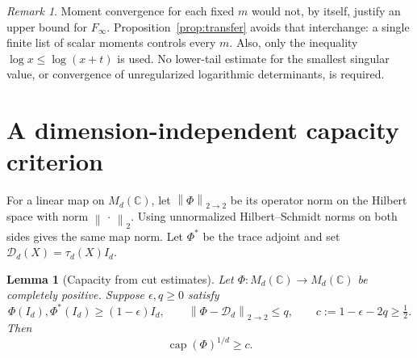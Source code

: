 \documentclass[11pt]{article}
\newtheorem{lemma}[theorem]{Lemma}
\theoremstyle{remark}
\newtheorem{remark}[theorem]{Remark}
\DeclareMathOperator{\capop}{cap}
\newcommand{\C}{\mathbb C}
\newcommand{\M}{M}
\newcommand{\Dep}{\mathcal D}
\newcommand{\hs}{2\to2}
\newcommand{\Finf}{F_{\infty}}
\newcommand{\norm}[1]{\left\lVert#1\right\rVert}
\begin{document}
\begin{remark}\label{rem:uniform}
Moment convergence for each fixed $m$ would not, by itself,
justify an upper bound for $\Finf$. Proposition~\ref{prop:transfer}
avoids that interchange: a single finite list of scalar moments
controls every $m$. Also, only the inequality
$\log x\leq\log(x+t)$ is used. No lower-tail estimate for the
smallest singular value, or convergence of unregularized
logarithmic determinants, is required.
\end{remark}

\section{A dimension-independent capacity criterion}
\label{sec:capacity}

For a linear map on $\M_d(\C)$, let $\norm{\Phi}_{\hs}$ be its
operator norm on the Hilbert space with norm $\norm{\,\cdot\,}_2$.
Using unnormalized Hilbert--Schmidt norms on both sides gives
the same map norm. Let $\Phi^*$ be the trace adjoint and set
$\Dep_d(X)=\tau_d(X)I_d$.

\begin{lemma}[Capacity from cut estimates]\label{lem:cuts}
Let $\Phi:\M_d(\C)\to\M_d(\C)$ be completely positive.
Suppose $\epsilon,q\geq0$ satisfy
\begin{equation}
 \Phi(I_d),\Phi^*(I_d)\geq(1-\epsilon)I_d,\qquad
 \norm{\Phi-\Dep_d}_{\hs}\leq q,\qquad
 c:=1-\epsilon-2q\geq\tfrac12. \label{eq:cut-hyp}
\end{equation}
Then
\begin{equation}
 \capop(\Phi)^{1/d}\geq c. \label{eq:cut-conclusion}
\end{equation}
\end{lemma}
\end{document}
